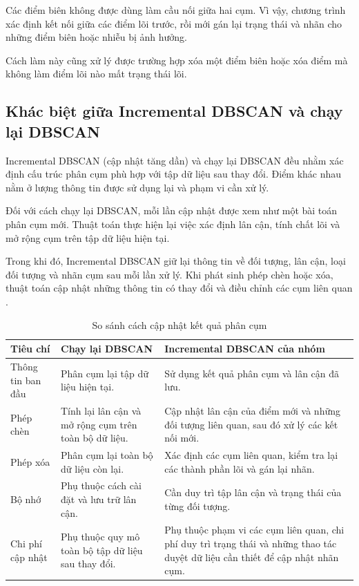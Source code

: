 Các điểm biên không được dùng làm cầu nối giữa hai cụm. Vì vậy, chương trình xác định kết nối giữa các điểm lõi trước, rồi mới gán lại trạng thái và nhãn cho những điểm biên hoặc nhiễu bị ảnh hưởng.

Cách làm này cũng xử lý được trường hợp xóa một điểm biên hoặc xóa điểm mà không làm điểm lõi nào mất trạng thái lõi.

\subsection{Khác biệt giữa Incremental DBSCAN và chạy lại DBSCAN}

Incremental DBSCAN (cập nhật tăng dần)  và chạy lại DBSCAN đều nhằm xác định cấu trúc phân cụm phù hợp với tập dữ liệu sau thay đổi. Điểm khác nhau nằm ở lượng thông tin được sử dụng lại và phạm vi cần xử lý.

Đối với cách chạy lại DBSCAN, mỗi lần cập nhật được xem như một bài toán phân cụm mới. Thuật toán thực hiện lại việc xác định lân cận, tính chất lõi và mở rộng cụm trên tập dữ liệu hiện tại.

Trong khi đó, Incremental DBSCAN giữ lại thông tin về đối tượng, lân cận, loại đối tượng và nhãn cụm sau mỗi lần xử lý. Khi phát sinh phép chèn hoặc xóa, thuật toán cập nhật những thông tin có thay đổi và điều chỉnh các cụm liên quan \parencite{ester1998incrementaldbscan}.

\begin{table}[H]
\centering
\caption{So sánh cách cập nhật kết quả phân cụm}
\label{tab:incremental_vs_refit}
\normalsize
\begin{tabularx}{\textwidth}{|P{3.1cm}|Y|Y|}\hline
\textbf{Tiêu chí} & \textbf{Chạy lại DBSCAN} & \textbf{Incremental DBSCAN của nhóm} \\\hline
Thông tin ban đầu &
Phân cụm lại tập dữ liệu hiện tại. &
Sử dụng kết quả phân cụm và lân cận đã lưu. \\\hline
Phép chèn &
Tính lại lân cận và mở rộng cụm trên toàn bộ dữ liệu. &
Cập nhật lân cận của điểm mới và những đối tượng liên quan, sau đó xử lý các kết nối mới. \\\hline
Phép xóa &
Phân cụm lại toàn bộ dữ liệu còn lại. &
Xác định các cụm liên quan, kiểm tra lại các thành phần lõi và gán lại nhãn. \\\hline
Bộ nhớ &
Phụ thuộc cách cài đặt và lưu trữ lân cận. &
Cần duy trì tập lân cận và trạng thái của từng đối tượng. \\\hline
Chi phí cập nhật &
Phụ thuộc quy mô toàn bộ tập dữ liệu sau thay đổi. &
Phụ thuộc phạm vi các cụm liên quan, chi phí duy trì trạng thái và những thao tác duyệt dữ liệu cần thiết để cập nhật nhãn cụm.\\\hline
\end{tabularx}
\end{table}

